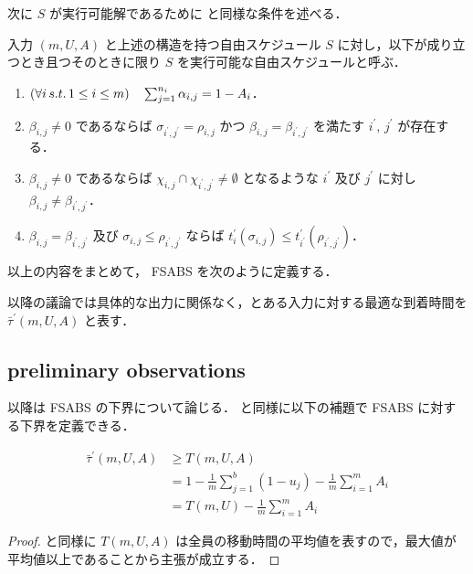 次に $S$ が実行可能解であるために \textcite{czyzowicz} と同様な条件を述べる．
\begin{definition}
  入力 $(m, U, A)$ と上述の構造を持つ自由スケジュール $S$ に対し，以下が成り立つとき且つそのときに限り $S$ を実行可能な自由スケジュールと呼ぶ．
  \begin{enumerate}
  \item $(\forall i\,s.t.\, 1 \leq i \leq m)\quad \sum_{j=1}^{n_i} \alpha_{i,j} = 1 - A_i$．
  \item $\beta_{i,j} \neq 0$ であるならば $\sigma_{i^\prime, j^\prime} = \rho_{i,j} \text{ かつ } \beta_{i,j} = \beta_{i^\prime, j^\prime}$ を満たす $i^\prime$, $j^\prime$ が存在する．
  \item $\beta_{i,j} \neq 0$ であるならば $\chi_{i,j} \cap \chi_{i^\prime,j^\prime} \neq \emptyset$ となるような $i^\prime$ 及び $j^\prime$ に対し $\beta_{i,j} \neq \beta_{i^\prime,j ^\prime}$．
  \item $\beta_{i,j} = \beta_{i^\prime, j^\prime}$ 及び $\sigma_{i,j} \leq \rho_{i^\prime, j^{\prime}}$ ならば $t^{\prime}_i(\sigma_{i, j}) \leq t^{\prime}_{i^\prime}(\rho_{i^\prime, j^\prime})$．
  \end{enumerate}
\end{definition}

以上の内容をまとめて， FSABS を次のように定義する．
\begin{problem}
\end{problem}
以降の議論では具体的な出力に関係なく，とある入力に対する最適な到着時間を $\bar\tau^\prime(m, U, A)$ と表す．

\subsection{preliminary observations}

以降は FSABS の下界について論じる．  と同様に以下の補題で FSABS に対する下界を定義できる．
\begin{lemma}
  \begin{align}
    \bar\tau^{\prime}(m, U, A) &\geq T(m, U, A) \\
                      &= 1 - \frac{1}{m}\sum_{j = 1}^b (1 - u_j) - \frac{1}{m}\sum_{i = 1}^{m} A_i \\
                      &= T(m, U) - \frac{1}{m}\sum_{i = 1}^{m} A_i
  \end{align}
\end{lemma}
\begin{proof}
   と同様に $T(m, U, A)$ は全員の移動時間の平均値を表すので，最大値が平均値以上であることから主張が成立する．
\end{proof}

